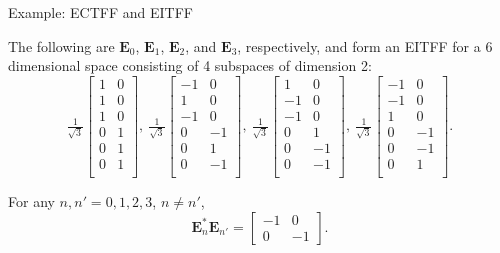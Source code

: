 \documentclass[12pt]{beamer}
\newcommand{\bfE}{\mathbf{E}}
\begin{document}
\begin{frame}[noframenumbering]{Example: ECTFF and EITFF}
\footnotesize{
The following are $\bfE_0$, $\bfE_1$, $\bfE_2$, and $\bfE_3$, respectively, and form an EITFF for a 6 dimensional space consisting of 4 subspaces of dimension 2:
\begin{equation*}
    \tfrac1{\sqrt{3}}\left[\begin{array}{rr}
    1 & 0\\
    1 & 0\\
    1 & 0\\
    0 & 1\\
    0 & 1\\
    0 & 1\\
    \end{array}\right],\
    \tfrac1{\sqrt{3}}\left[\begin{array}{rr}
    -1 &  0\\
     1 &  0\\
    -1 &  0\\
     0 & -1\\
     0 &  1\\
     0 & -1\\
    \end{array}\right],\
    \tfrac1{\sqrt{3}}\left[\begin{array}{rr}
     1 &  0\\
    -1 &  0\\
    -1 &  0\\
     0 &  1\\
     0 & -1\\
     0 & -1\\
    \end{array}\right],\
    \tfrac1{\sqrt{3}}\left[\begin{array}{rr}
    -1 &  0\\
    -1 &  0\\
     1 &  0\\
     0 & -1\\
     0 & -1\\
     0 &  1\\
    \end{array}\right].
\end{equation*}

\vfill

For any $n,n'=0,1,2,3$, $n\not=n'$, 
\begin{equation*}
    \bfE_n^*\bfE_{n'}^{}=
    \left[\begin{array}{rr}
    -1 &  0 \\
     0 & -1
    \end{array}\right].
\end{equation*}
}
\end{frame}
\end{document}
